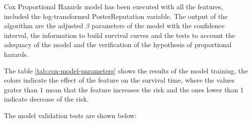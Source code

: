 \documentclass[11pt]{book} %
\begin{document}
        Cox Proportional Hazards model has been executed with all the features, included the log-transformed PosterReputation variable. The output of the algorithm are the adjusted $\beta$ parameters of the model with the confidence interval, the information to build survival curves and the tests to account the adequacy of the model and the verification of the hypothesis of proportional hazards.

        \begin{table}[!ht]
          \centering
          \caption{Cox PH Model parameters}
          \label{tab:cox-model-parameters}
        \end{table}

        The table \ref{tab:cox-model-parameters} shows the results of the model training, the colors indicate the effect of the feature on the survival time, where the values grater than $1$ mean that the feature increases the risk and the ones lower than $1$ indicate decrease of the risk.

        The model validation tests are shown below:
\end{document}
